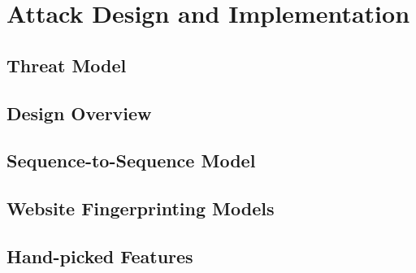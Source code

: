\section{Attack Design and Implementation}

\subsection{Threat Model}


\subsection{Design Overview}


\subsection{Sequence-to-Sequence Model}

\subsection{Website Fingerprinting Models}


\subsection{Hand-picked Features}
